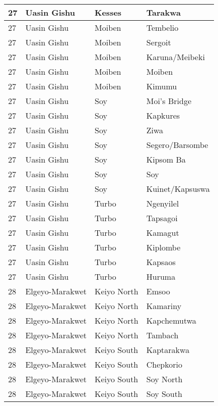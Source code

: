 \begin{table}[!ht]
\begin{tabular}{|l|l|l|l|}
        27 & Uasin Gishu & Kesses & Tarakwa \\ \hline
        27 & Uasin Gishu & Moiben & Tembelio \\ \hline
        27 & Uasin Gishu & Moiben & Sergoit \\ \hline
        27 & Uasin Gishu & Moiben & Karuna/Meibeki \\ \hline
        27 & Uasin Gishu & Moiben & Moiben \\ \hline
        27 & Uasin Gishu & Moiben & Kimumu \\ \hline
        27 & Uasin Gishu & Soy & Moi’s Bridge \\ \hline
        27 & Uasin Gishu & Soy & Kapkures \\ \hline
        27 & Uasin Gishu & Soy & Ziwa \\ \hline
        27 & Uasin Gishu & Soy & Segero/Barsombe \\ \hline
        27 & Uasin Gishu & Soy & Kipsom Ba \\ \hline
        27 & Uasin Gishu & Soy & Soy \\ \hline
        27 & Uasin Gishu & Soy & Kuinet/Kapsuswa \\ \hline
        27 & Uasin Gishu & Turbo & Ngenyilel \\ \hline
        27 & Uasin Gishu & Turbo & Tapsagoi \\ \hline
        27 & Uasin Gishu & Turbo & Kamagut \\ \hline
        27 & Uasin Gishu & Turbo & Kiplombe \\ \hline
        27 & Uasin Gishu & Turbo & Kapsaos \\ \hline
        27 & Uasin Gishu & Turbo & Huruma \\ \hline
        28 & Elgeyo-Marakwet & Keiyo North & Emsoo \\ \hline
        28 & Elgeyo-Marakwet & Keiyo North & Kamariny \\ \hline
        28 & Elgeyo-Marakwet & Keiyo North & Kapchemutwa \\ \hline
        28 & Elgeyo-Marakwet & Keiyo North & Tambach \\ \hline
        28 & Elgeyo-Marakwet & Keiyo South & Kaptarakwa \\ \hline
        28 & Elgeyo-Marakwet & Keiyo South & Chepkorio \\ \hline
        28 & Elgeyo-Marakwet & Keiyo South & Soy North \\ \hline
        28 & Elgeyo-Marakwet & Keiyo South & Soy South \\ \hline

\end{tabular}
\end{table}
